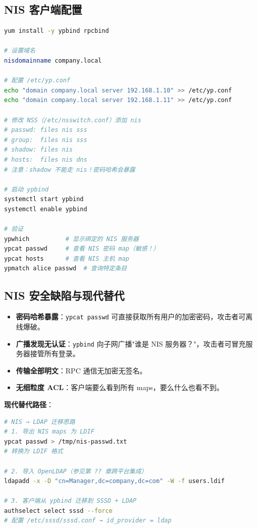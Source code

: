 \documentclass[12pt,UTF8]{ctexbook}
\begin{document}
\subsection{NIS 客户端配置}

\begin{lstlisting}[language=bash]
yum install -y ypbind rpcbind

# 设置域名
nisdomainname company.local

# 配置 /etc/yp.conf
echo "domain company.local server 192.168.1.10" >> /etc/yp.conf
echo "domain company.local server 192.168.1.11" >> /etc/yp.conf

# 修改 NSS（/etc/nsswitch.conf）添加 nis
# passwd: files nis sss
# group:  files nis sss
# shadow: files nis
# hosts:  files nis dns
# 注意：shadow 不能走 nis！密码哈希会暴露

# 启动 ypbind
systemctl start ypbind
systemctl enable ypbind

# 验证
ypwhich          # 显示绑定的 NIS 服务器
ypcat passwd     # 查看 NIS 密码 map（敏感！）
ypcat hosts      # 查看 NIS 主机 map
ypmatch alice passwd  # 查询特定条目
\end{lstlisting}

\subsection{NIS 安全缺陷与现代替代}

\begin{itemize}
    \item \textbf{密码哈希暴露}：\texttt{ypcat passwd} 可直接获取所有用户的加密密码，攻击者可离线爆破。
    \item \textbf{广播发现无认证}：\texttt{ypbind} 向子网广播"谁是 NIS 服务器？"，攻击者可冒充服务器接管所有登录。
    \item \textbf{传输全部明文}：RPC 通信无加密无签名。
    \item \textbf{无细粒度 ACL}：客户端要么看到所有 maps，要么什么也看不到。
\end{itemize}

\textbf{现代替代路径}：
\begin{lstlisting}[language=bash]
# NIS → LDAP 迁移思路
# 1. 导出 NIS maps 为 LDIF
ypcat passwd > /tmp/nis-passwd.txt
# 转换为 LDIF 格式

# 2. 导入 OpenLDAP（参见第 ?? 章跨平台集成）
ldapadd -x -D "cn=Manager,dc=company,dc=com" -W -f users.ldif

# 3. 客户端从 ypbind 迁移到 SSSD + LDAP
authselect select sssd --force
# 配置 /etc/sssd/sssd.conf → id_provider = ldap
\end{lstlisting}
\end{document}
